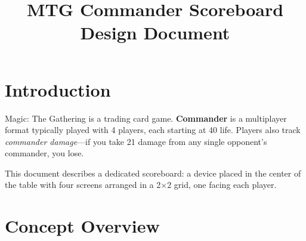\documentclass[11pt,a4paper]{article}
\title{MTG Commander Scoreboard\\[0.5em]\large Design Document}
\author{}
\date{}
\begin{document}
\maketitle

\section{Introduction}

Magic: The Gathering is a trading card game. \textbf{Commander} is a multiplayer format typically played with 4 players, each starting at 40 life. Players also track \emph{commander damage}---if you take 21 damage from any single opponent's commander, you lose.

This document describes a dedicated scoreboard: a device placed in the center of the table with four screens arranged in a 2$\times$2 grid, one facing each player.

\section{Concept Overview}
\end{document}
